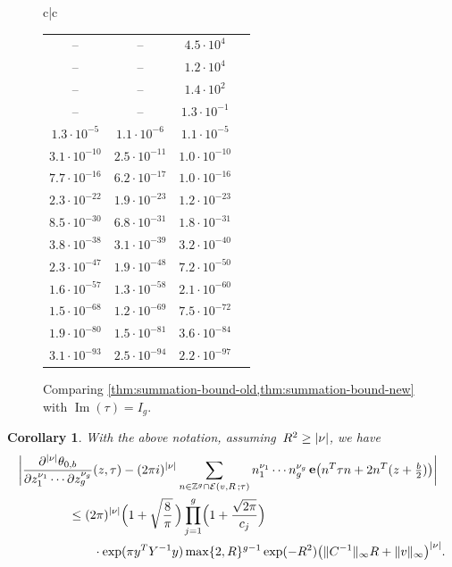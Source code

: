 \documentclass[12pt,oneside]{amsart}
\numberwithin{equation}{section}
\newtheorem{cor}[equation]{Corollary}
\theoremstyle{definition}
\newcommand{\Z}{\mathbb{Z}}
\newcommand{\eld}[3]{\ensuremath{\mathcal{E}(#1, #2\,; #3)}}
\DeclareMathOperator{\im}{Im}
\DeclareMathOperator{\e}{\mathbf{e}}
\DeclarePairedDelimiter{\abs}{|}{|}
\DeclarePairedDelimiter{\paren}{(}{)}
\DeclarePairedDelimiter{\norm}{\|}{\|}
\begin{document}
\begin{figure}[ht]
\begin{tabular}{c|c}
\begin{tabular}{cccc}
      -- & -- & %
      $4.5\cdot 10^4$ \\
      -- & -- & %
      $1.2\cdot 10^4$ \\
      -- & -- & %
      $1.4\cdot 10^2$ \\
      -- & -- & %
      $1.3\cdot 10^{-1}$ \\
      $1.3\cdot 10^{-5}$
                                       & $ 1.1 \cdot 10^{-6} $ & %
      $1.1\cdot 10^{-5}$ \\
       $ 3.1 \cdot 10^{-10} $ & $ 2.5 \cdot 10^{-11} $ & $ 1.0 \cdot 10^{-10} $ \\
       $ 7.7 \cdot 10^{-16} $ & $ 6.2 \cdot 10^{-17} $ & $ 1.0 \cdot 10^{-16} $ \\
       $ 2.3 \cdot 10^{-22} $ & $ 1.9 \cdot 10^{-23} $ & $ 1.2 \cdot 10^{-23} $ \\
       $ 8.5 \cdot 10^{-30} $ & $ 6.8 \cdot 10^{-31} $ & $ 1.8 \cdot 10^{-31} $ \\
       $ 3.8 \cdot 10^{-38} $ & $ 3.1 \cdot 10^{-39} $ & $ 3.2 \cdot 10^{-40} $ \\
       $ 2.3 \cdot 10^{-47} $ & $ 1.9 \cdot 10^{-48} $ & $ 7.2 \cdot 10^{-50} $ \\
       $ 1.6 \cdot 10^{-57} $ & $ 1.3 \cdot 10^{-58} $ & $ 2.1 \cdot 10^{-60} $ \\
       $ 1.5 \cdot 10^{-68} $ & $ 1.2 \cdot 10^{-69} $ & $ 7.5 \cdot 10^{-72} $ \\
       $ 1.9 \cdot 10^{-80} $ & $ 1.5 \cdot 10^{-81} $ & $ 3.6 \cdot 10^{-84} $ \\
       $ 3.1 \cdot 10^{-93} $ & $ 2.5 \cdot 10^{-94} $ & $ 2.2 \cdot 10^{-97} $ \\
    \end{tabular}
  \end{tabular}
  \caption{Comparing \cref{thm:summation-bound-old,thm:summation-bound-new} with
    $\im(\tau) = I_g$.}
  \label{fig:cmp-bounds}
\end{figure}


\begin{cor}
  \label{cor:theta-tail}
  With the above notation, assuming~$R^2\geq\abs{\nu}$, we have
  \begin{align*}
    &\abs[\bigg]{\frac{\partial^{\abs{\nu}} \theta_{0,b}}{\partial z_1^{\nu_1}\cdots\partial z_{g}^{\nu_g}}(z,\tau)
      - (2 \pi i)^{\abs{\nu}} \sum_{n\in \Z^g \cap \eld{v}{R}{\tau}} n_1^{\nu_1}\cdots n_{g}^{\nu_{g}}
      \e\paren[\big]{n^T\tau n + 2n^T(z + \tfrac b2)} } \\
    &\qquad\qquad \leq (2\pi)^{\abs{\nu}} \paren[\Big]{1 + \sqrt{\frac 8\pi}\,} \prod_{j=1}^{g} \paren[\Big]{1 + \frac{\sqrt{2\pi}}{c_j}} \\
    &\qquad\qquad \qquad \cdot  \exp(\pi y^TY^{-1}y) \max\{2,R\}^{g-1} \exp(- R^2)  \paren[\big]{\norm{C^{-1}}_\infty R + \norm{v}_\infty}^{\abs{\nu}}.
  \end{align*}
\end{cor}
\end{document}
